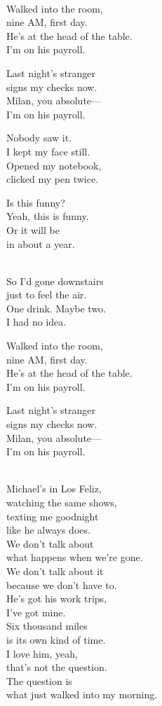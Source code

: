 \begin{lyrics}
\\
Walked into the room,\\
nine AM, first day.\\
He's at the head of the table.\\
I'm on his payroll.

Last night's stranger\\
signs my checks now.\\
Milan, you absolute—\\
I'm on his payroll.

Nobody saw it.\\
I kept my face still.\\
Opened my notebook,\\
clicked my pen twice.

Is this funny?\\
Yeah, this is funny.\\
Or it will be\\
in about a year.

\\
So I'd gone downstairs\\
just to feel the air.\\
One drink. Maybe two.\\
I had no idea.

Walked into the room,\\
nine AM, first day.\\
He's at the head of the table.\\
I'm on his payroll.

Last night's stranger\\
signs my checks now.\\
Milan, you absolute—\\
I'm on his payroll.

\\
Michael's in Los Feliz,\\
watching the same shows,\\
texting me goodnight\\
like he always does.\\
We don't talk about\\
what happens when we're gone.\\
We don't talk about it\\
because we don't have to.\\
He's got his work trips,\\
I've got mine.\\
Six thousand miles\\
is its own kind of time.\\
I love him, yeah,\\
that's not the question.\\
The question is\\
what just walked into my morning.


\end{lyrics}
